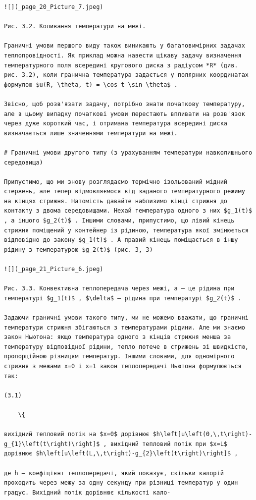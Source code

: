 \documentclass[
  ukrainian,
]{article}
\begin{document}
\begin{verbatim}
![](_page_20_Picture_7.jpeg)

Рис. 3.2. Коливання температури на межі.

Граничні умови першого виду також виникають у багатовимірних задачах теплопровідності. Як приклад можна навести цікаву задачу визначення температурного поля всередині кругового диска з радіусом *R* (див. рис. 3.2), коли гранична температура задається у полярних координатах формулою $u(R, \theta, t) = \cos t \sin \theta$ .

Звісно, щоб розв'язати задачу, потрібно знати початкову температуру, але в цьому випадку початкові умови перестають впливати на розв'язок через дуже короткий час, і отримана температура всередині диска визначається лише значеннями температури на межі.

# Граничні умови другого типу (з урахуванням температури навколишнього середовища)

Припустимо, що ми знову розглядаємо термічно ізольований мідний стержень, але тепер відмовляємося від заданого температурного режиму на кінцях стрижня. Натомість давайте наблизимо кінці стрижня до контакту з двома середовищами. Нехай температура одного з них $g_1(t)$ , а іншого $g_2(t)$ . Іншими словами, припустимо, що лівий кінець стрижня поміщений у контейнер із рідиною, температура якої змінюється відповідно до закону $g_1(t)$ . А правий кінець поміщається в іншу рідину з температурою $g_2(t)$ (рис. 3, 3)

![](_page_21_Picture_6.jpeg)

Рис. 3.3. Конвективна теплопередача через межі, a — це рідина при температурі $g_1(t)$ , $\delta$ — рідина при температурі $g_2(t)$ .

Задаючи граничні умови такого типу, ми не можемо вважати, що граничні температури стрижня збігаються з температурами рідини. Але ми знаємо закон Ньютона: якщо температура одного з кінців стрижня менша за температуру відповідної рідини, тепло потече в стрижень зі швидкістю, пропорційною різницям температур. Іншими словами, для одномірного стрижня з межами x=0 і x=1 закон теплопередачі Ньютона формулюється так:

(3.1)

    \{

вихідний тепловий потік на $x=0$ дорівнює $h\left[u\left(0,\,t\right)-g_{1}\left(t\right)\right]$ , вихідний тепловий потік при $x=L$ дорівнює $h\left[u\left(L,\,t\right)-g_{2}\left(t\right)\right]$ ,

де h — коефіцієнт теплопередачі, який показує, скільки калорій проходить через межу за одну секунду при різниці температур у один градус. Вихідний потік дорівнює кількості кало-


\end{verbatim}
\end{document}
